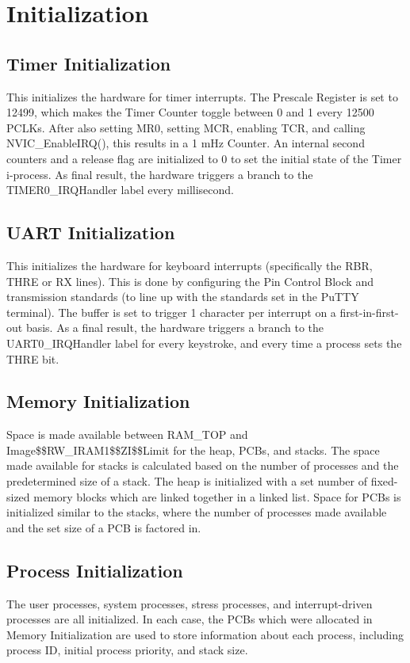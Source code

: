 \documentclass[12pt]{article}
\begin{document}
\section{Initialization}
\subsection*{Timer Initialization}
This initializes the hardware for timer interrupts. The Prescale Register is set to 12499, which makes the Timer Counter toggle between 0 and 1 every 12500 PCLKs. After also setting MR0, setting MCR, enabling TCR, and calling NVIC\_EnableIRQ(), this results in a 1 mHz Counter. An internal second counters and a release flag are initialized to 0 to set the initial state of the Timer i-process. As final result, the hardware triggers a branch to the TIMER0\_IRQHandler label every millisecond.
\subsection*{UART Initialization}
This initializes the hardware for keyboard interrupts (specifically the RBR, THRE or RX lines). This is done by configuring the Pin Control Block and transmission standards (to line up with the standards set in the PuTTY terminal). The buffer is set to trigger 1 character per interrupt on a first-in-first-out basis. As a final result, the hardware triggers a branch to the UART0\_IRQHandler label for every keystroke, and every time a process sets the THRE bit.
\subsection*{Memory Initialization}
Space is made available between RAM\_TOP and Image\$\$RW\_IRAM1\$\$ZI\$\$Limit for the heap, PCBs, and stacks. The space made available for stacks is calculated based on the number of processes and the predetermined size of a stack. The heap is initialized with a set number of fixed-sized memory blocks which are linked together in a linked list. Space for PCBs is initialized similar to the stacks, where the number of processes made available and the set size of a PCB is factored in.
\subsection*{Process Initialization}
The user processes, system processes, stress processes, and interrupt-driven processes are all initialized. In each case, the PCBs which were allocated in Memory Initialization are used to store information about each process, including process ID, initial process priority, and stack size.
\newpage
\end{document}
